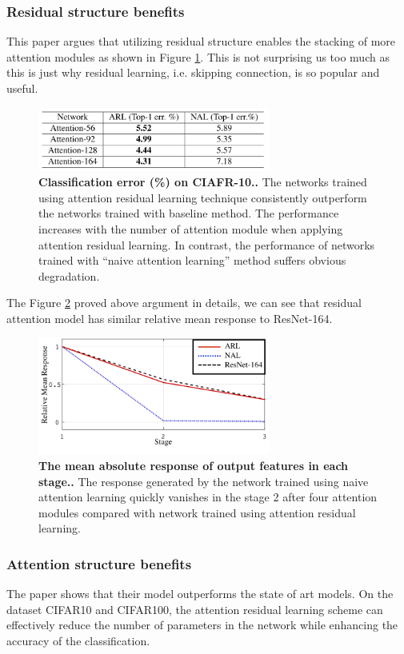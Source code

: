 \documentclass{article}
\newcommand{\mycaption}[2]{\caption[#1]{\textbf{#1.} #2}}
\begin{document}
\begin{multicols}{2}
\subsubsection{Residual structure benefits}
This paper argues that utilizing residual structure enables the stacking of more attention modules as shown in Figure \ref{fig:cifar10_residual}. This is not surprising us too much as this is just why residual learning, i.e. skipping connection, is so popular and useful.
\begin{figure}[H] 
\includegraphics[width=3in]{imgs/cifar10_residual.png}  
\mycaption{Classification error (\%) on CIAFR-10.}{The networks trained using attention residual learning technique consistently outperform the networks trained with baseline method. The performance increases with the number of attention module when applying attention residual learning. In contrast, the performance of networks trained with “naive attention learning” method suffers obvious degradation.}  
\label{fig:cifar10_residual}
\end{figure}
The Figure \ref{fig:cifar10_stages} proved above argument in details, we can see that residual attention model has similar relative mean response to ResNet-164.
\begin{figure}[H] 
\includegraphics[width=3in]{imgs/cifar10_stages.png}  
\mycaption{The mean absolute response of output features in each stage.}{The response generated by the network trained using naive attention learning quickly vanishes in the stage 2 after four attention modules compared with network trained using attention residual learning.}  
\label{fig:cifar10_stages}
\end{figure}

\subsubsection{Attention structure benefits}
The paper shows that their model outperforms the state of art models. On the dataset CIFAR10 and CIFAR100, the attention residual learning scheme can effectively reduce the number of parameters in the network while enhancing the accuracy of the classification.


\end{multicols}
\end{document}
